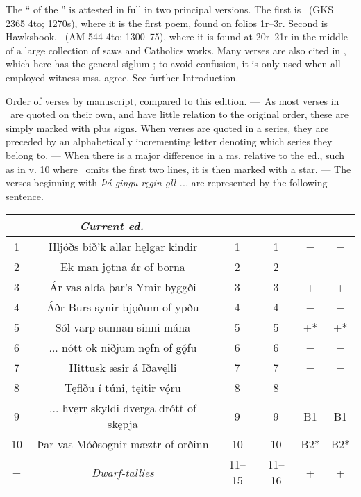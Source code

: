

{\small The “ of the ” is attested in full in two principal versions. The first is \Regius\ (GKS 2365 4to; 1270s), where it is the first poem, found on folios 1r–3r. Second is Hawksbook, \Hauksbok\ (AM 544 4to; 1300–75), where it is found at 20r–21r in the middle of a large collection of saws and Catholics works. Many verses are also cited in \Gylfaginning, which here has the general siglum \GylfMS; to avoid confusion, it is only used when all employed witness mss. agree. See further Introduction. %

Order of verses by manuscript, compared to this edition. — As most verses in \GylfMS\ are quoted on their own, and have little relation to the original order, these are simply marked with plus signs. When verses are quoted in a series, they are preceded by an alphabetically incrementing letter denoting which series they belong to. — When there is a major difference in a ms. relative to the ed., such as in v. 10 where \GylfMS\ omits the first two lines, it is then marked with a star. — The verses beginning with \emph{Þá gingu ręgin ǫll ...} are represented by the following sentence.
\begin{longtable}{|c c c c c c|}
	\hline
	\multicolumn{2}{|c}{\emph{Current ed.}} & \Regius & \Hauksbok & \RegiusProse\Trajectinus\Wormianus & \Upsaliensis \\ [0.5ex]
	\hline\hline
	1 & Hljóðs bið’k allar hęlgar kindir & 1 & 1 & − & − \\
	2 & Ek man jǫtna ár of borna & 2 & 2 & − & − \\
	3 & Ár vas alda þar’s Ymir byggði & 3 & 3 & + & + \\
	4 & Áðr Burs synir bjǫðum of ypðu & 4 & 4 & − & − \\
	5 & Sól varp sunnan sinni mána & 5 & 5 & +* & +* \\
	6 & ... nótt ok niðjum nǫfn of gǫ́fu & 6 & 6 & − & − \\
	7 & Hittusk æsir á Iðavęlli & 7 & 7 & − & − \\
	8 & Tęflðu í túni, tęitir vǫ́ru & 8 & 8 & − & − \\
	9 & ... hvęrr skyldi dverga drótt of skępja & 9 & 9 & B1 & B1 \\
	10 & Þar vas Móðsognir mæztr of orðinn & 10 & 10 & B2* & B2* \\
	− & \emph{Dwarf-tallies} & 11–15 & 11–16 & + & + \\

\end{longtable}}
